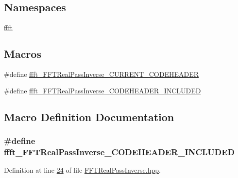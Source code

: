 \subsection*{Namespaces}
\begin{DoxyCompactItemize}
\item 
 \hyperlink{a00142}{ffft}
\end{DoxyCompactItemize}
\subsection*{Macros}
\begin{DoxyCompactItemize}
\item 
\#define \hyperlink{a00103_ae931353e6f478a7f98f0ee9fabf2f1cb}{ffft\+\_\+\+F\+F\+T\+Real\+Pass\+Inverse\+\_\+\+C\+U\+R\+R\+E\+N\+T\+\_\+\+C\+O\+D\+E\+H\+E\+A\+D\+E\+R}
\item 
\#define \hyperlink{a00103_a4059fcd80b5209e6ac195daa967a6393}{ffft\+\_\+\+F\+F\+T\+Real\+Pass\+Inverse\+\_\+\+C\+O\+D\+E\+H\+E\+A\+D\+E\+R\+\_\+\+I\+N\+C\+L\+U\+D\+E\+D}
\end{DoxyCompactItemize}


\subsection{Macro Definition Documentation}
\hypertarget{a00103_a4059fcd80b5209e6ac195daa967a6393}{
\subsubsection[{ffft\+\_\+\+F\+F\+T\+Real\+Pass\+Inverse\+\_\+\+C\+O\+D\+E\+H\+E\+A\+D\+E\+R\+\_\+\+I\+N\+C\+L\+U\+D\+E\+D}]{\setlength{\rightskip}{0pt plus 5cm}\#define ffft\+\_\+\+F\+F\+T\+Real\+Pass\+Inverse\+\_\+\+C\+O\+D\+E\+H\+E\+A\+D\+E\+R\+\_\+\+I\+N\+C\+L\+U\+D\+E\+D}}\label{a00103_a4059fcd80b5209e6ac195daa967a6393}


Definition at line \hyperlink{a00103_source_l00024}{24} of file \hyperlink{a00103_source}{F\+F\+T\+Real\+Pass\+Inverse.\+hpp}.


